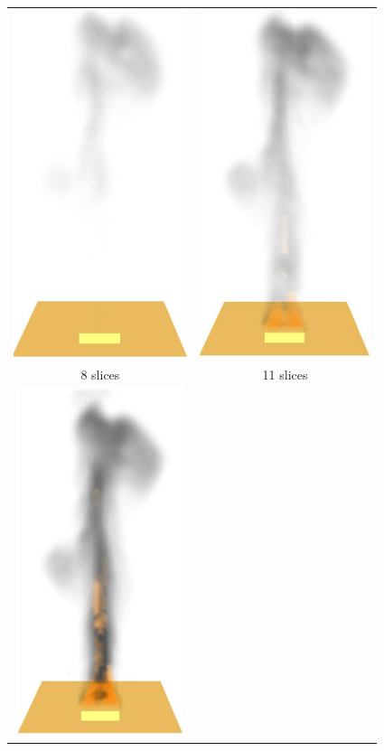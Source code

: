 {\begin{figure}[\figoptions]
\begin{center}
\begin{tabular}{cc}
\includegraphics[height=4.0in]{figures/splume_20_27}&
\includegraphics[height=4.0in]{figures/splume_17_27}\\
8 slices&11 slices\\
\includegraphics[height=4.0in]{figures/splume_14_27}&

\end{tabular}
\end{center}
\end{figure}}
